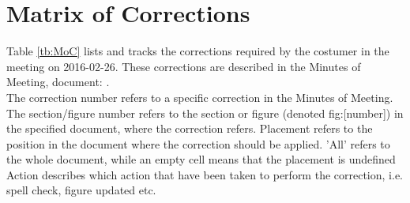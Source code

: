 
\chapter{Matrix of Corrections}
\label{chp:matrix}

Table \ref{tb:MoC} lists and tracks the corrections required by the costumer in the meeting on 2016-02-26. These corrections are described in the Minutes of Meeting, document: \momFebTwentySix.\\

The correction number refers to a specific correction in the Minutes of Meeting. 
The section/figure number refers to the section or figure (denoted fig:[number]) in the specified document, where the correction refers. 
Placement refers to the position in the document where the correction should be applied. 'All' refers to the whole document, while an empty cell means that the placement is undefined
Action describes which action that have been taken to perform the correction, i.e. spell check, figure updated etc.\\

